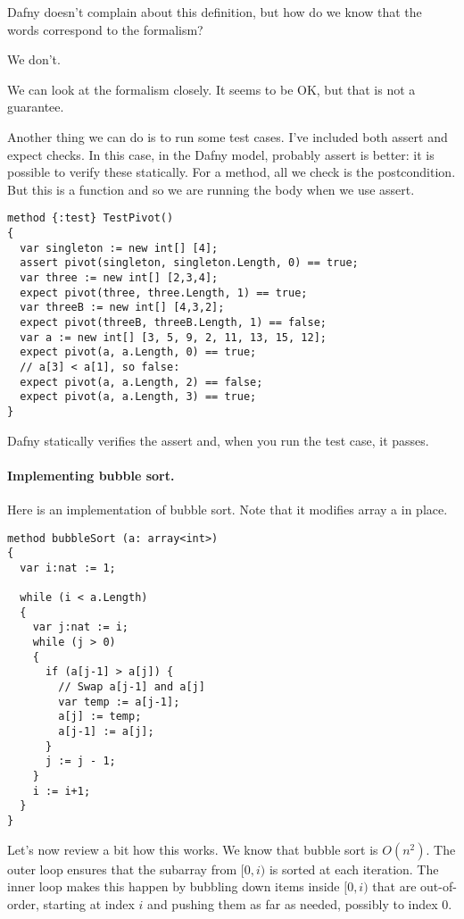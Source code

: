\documentclass[11pt]{article}
\begin{document}
Dafny doesn't complain about this definition, but how do we know that the words
correspond to the formalism?

We don't.

We can look at the formalism closely. It seems to be OK, but that is not a guarantee.

Another thing we can do is to run some test cases. I've included both \textsf{assert} and
\textsf{expect} checks. In this case, in the Dafny model, probably \textsf{assert} is better: it is possible
to verify these statically. For a \textsf{method}, all we check is the postcondition. But this is a function
and so we are running the body when we use \textsf{assert}.

\begin{lstlisting}[language=dafny]
method {:test} TestPivot()
{
  var singleton := new int[] [4];
  assert pivot(singleton, singleton.Length, 0) == true;
  var three := new int[] [2,3,4];
  expect pivot(three, three.Length, 1) == true;
  var threeB := new int[] [4,3,2];
  expect pivot(threeB, threeB.Length, 1) == false;
  var a := new int[] [3, 5, 9, 2, 11, 13, 15, 12];
  expect pivot(a, a.Length, 0) == true;
  // a[3] < a[1], so false:
  expect pivot(a, a.Length, 2) == false;
  expect pivot(a, a.Length, 3) == true;
}
\end{lstlisting}
Dafny statically verifies the \textsf{assert} and, when you run the test case, it passes.

\paragraph{Implementing bubble sort.} Here is an implementation of bubble sort.
Note that it modifies array \textsf{a} in place.

\begin{lstlisting}[language=dafny]
method bubbleSort (a: array<int>)
{
  var i:nat := 1;

  while (i < a.Length)
  {
    var j:nat := i;
    while (j > 0)
    {
      if (a[j-1] > a[j]) {
        // Swap a[j-1] and a[j]
        var temp := a[j-1];
        a[j] := temp;
        a[j-1] := a[j];
      }
      j := j - 1;
    }
    i := i+1;
  }
}
\end{lstlisting}

Let's now review a bit how this works. We know that bubble sort is $O(n^2)$. The outer loop
ensures that the subarray from $[0, i)$ is sorted at each iteration. The inner loop makes this
happen by bubbling down items inside $[0, i)$ that are out-of-order, starting at index $i$
and pushing them as far as needed, possibly to index 0.
\end{document}
